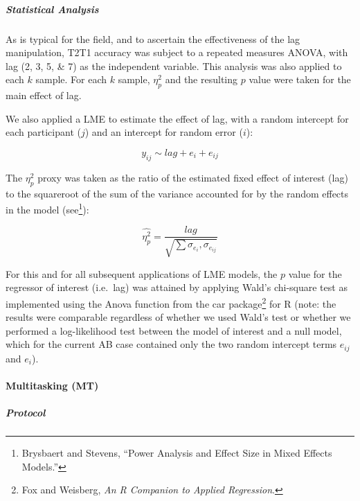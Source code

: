 \documentclass[
  12pt,
]{article}
\begin{document}
\hypertarget{statistical-analysis}{%
\subparagraph{Statistical Analysis}\label{statistical-analysis}}

As is typical for the field, and to ascertain the effectiveness of the lag manipulation, T2\textbar T1 accuracy was subject to a repeated measures ANOVA, with lag (2, 3, 5, \& 7) as the independent variable. This analysis was also applied to each \(k\) sample. For each \(k\) sample, \(\eta_{p}^{2}\) and the resulting \(p\) value were taken for the main effect of lag.

We also applied a LME to estimate the effect of lag, with a random intercept for each participant (\(j\)) and an intercept for random error (\(i\)):

\[y_{ij} \sim lag + e_{i} + e_{ij}\]

The \(\eta_{p}^{2}\) proxy was taken as the ratio of the estimated fixed effect of interest (lag) to the squareroot of the sum of the variance accounted for by the random effects in the model (see\footnote{Brysbaert and Stevens, ``Power Analysis and Effect Size in Mixed Effects Models.''}):

\[\hat{\eta_{p}^{2}} = \frac{lag}{\sqrt{\sum{\sigma_{e_{i}}, \sigma_{e_{ij}}}}}\]

For this and for all subsequent applications of LME models, the \(p\) value for the regressor of interest (i.e.~lag) was attained by applying Wald's chi-square test as implemented using the Anova function from the car package\footnote{Fox and Weisberg, \emph{An R Companion to Applied Regression}.} for R (note: the results were comparable regardless of whether we used Wald's test or whether we performed a log-likelihood test between the model of interest and a null model, which for the current AB case contained only the two random intercept terms \(e_{ij}\) and \(e_{i}\)).

\hypertarget{multitasking-mt}{%
\paragraph{Multitasking (MT)}\label{multitasking-mt}}

\hypertarget{protocol-1}{%
\subparagraph{Protocol}\label{protocol-1}}
\end{document}
